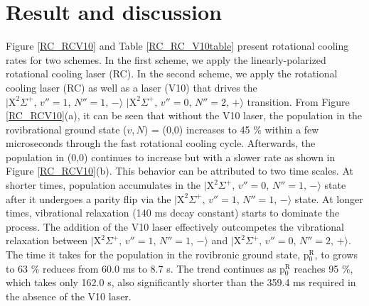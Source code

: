 \documentclass[twoside,twocolumn,9pt]{article}
\begin{document}
\section{Result and discussion}
Figure \ref{RC_RCV10} and Table \ref{RC_RC_V10table} present rotational cooling rates for two schemes. In the first scheme, we apply the linearly-polarized rotational cooling laser (RC). In the second scheme, we apply the rotational cooling laser (RC) as well as a laser (V10) that drives the $\lvert \mathrm{X}^2\Sigma^+,\, v''=1,\, N''=1,\, -\rangle$ \pp{--}  $\lvert \mathrm{X}^2\Sigma^+,\, v''=0,\, N''=2,\, +\rangle$ transition. From Figure \ref{RC_RCV10}(a), it can be seen that without the V10 laser, the population in the rovibrational ground state ($v$,\,$N$) = (0,0) increases to 45 $\%$ within a few microseconds through the fast rotational cooling cycle. Afterwards, the population in (0,0) continues to increase but with a slower rate as shown in Figure \ref{RC_RCV10}(b). This behavior can be attributed to two time scales. At shorter times, population accumulates in the $\lvert \mathrm{X}^2\Sigma^+,\, v''=0,\, N''=1,\, -\rangle$ state after it undergoes a parity flip via the $\lvert \mathrm{X}^2\Sigma^+,\, v''=1,\, N''=1,\, -\rangle$ state.  At longer times, vibrational relaxation (140 ms decay constant) starts to dominate the process. The addition of the V10 laser effectively outcompetes the vibrational relaxation between $\lvert \mathrm{X}^2\Sigma^+,\, v''=1,\, N''=1,\, -\rangle$ and $\lvert \mathrm{X}^2\Sigma^+,\, v''=0,\, N''=2,\, +\rangle$. The time it takes for the population in the rovibronic ground state, p$_{0}^\mathrm{R}$, to grows to 63 $\%$ reduces from 60.0 ms to 8.7 \si{\micro}s. The trend continues as p$_{0}^\mathrm{R}$ reaches 95 $\%$, which takes only 162.0 \si{\micro}s, also significantly shorter than the 359.4 ms required in the absence of the V10 laser.
\end{document}
